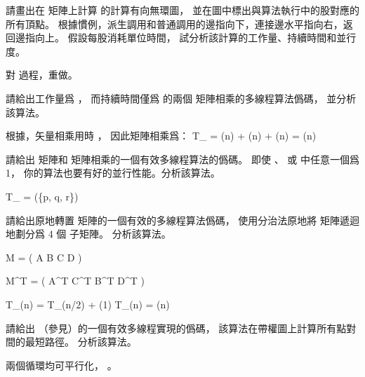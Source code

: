 \startsection[
  title={Multithreadedmatrix multiplication},
]

\startEXERCISE[exercise:27.2-1]
請畫出在  矩陣上計算  的計算有向無環圖，
並在圖中標出與算法執行中的股對應的所有頂點。
根據慣例，派生調用和普通調用的邊指向下，連接邊水平指向右，返回邊指向上。
假設每股消耗單位時間，
試分析該計算的工作量、持續時間和並行度。
\stopEXERCISE

\startANSWER
\externalfigure[output/e27_2_1-1]
\stopANSWER

\startEXERCISE
對  過程，重做\inexercise[27.2-1]。
\stopEXERCISE

\startANSWER
{}
\stopANSWER

\startEXERCISE
請給出工作量爲 ，
而持續時間僅爲  的兩個  矩陣相乘的多線程算法僞碼，
並分析該算法。
\stopEXERCISE

\startANSWER
根據\inexercise[27.1-6]，矢量相乘用時 ，
因此矩陣相乘爲：
\startformula
T_{\infty} = \Theta(\lg n) + \Theta(\lg n) + \Theta(\lg n) = \Theta(\lg n)
\stopformula
\stopANSWER

\startEXERCISE
請給出  矩陣和  矩陣相乘的一個有效多線程算法的僞碼。
即使 、  或  中任意一個爲 1，
你的算法也要有好的並行性能。分析該算法。
\stopEXERCISE

\startANSWER
\startformula
T_{\infty} = \Theta(\min\{\lg p, \lg q, \lg r\})
\stopformula
\stopANSWER

\startEXERCISE
請給出原地轉置  矩陣的一個有效的多線程算法僞碼，
使用分治法原地將  矩陣遞迴地劃分爲 4 個  子矩陣。
分析該算法。
\stopEXERCISE

\startANSWER
\startformula
M = \left(\startmatrix
\NC A \NC B \NR
\NC C \NC D \NR
\stopmatrix\right)
\stopformula

\startformula
M^T = \left(\startmatrix
\NC A^T \NC C^T \NR
\NC B^T \NC D^T \NR
\stopmatrix\right)
\stopformula

\startformula\startmathalignment
\NC T_{\infty}(n) \NC = T_{\infty}(n/2) + \Theta(1) \NR
\NC T_{\infty}(n) \NC = \Theta(\lg n) \NR
\stopmathalignment\stopformula
\stopANSWER

\startEXERCISE
請給出  （參見）的一個有效多線程實現的僞碼，
該算法在帶權圖上計算所有點對間的最短路徑。
分析該算法。
\stopEXERCISE

\startANSWER
兩個循環均可平行化， 。
\stopANSWER

\stopsection
